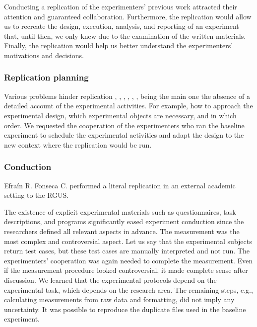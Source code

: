 Conducting a replication of the experimenters' previous work attracted their attention and guaranteed collaboration. Furthermore, the replication would allow us to recreate the design, execution, analysis, and reporting of an experiment that, until then, we only knew due to the examination of the written materials. Finally, the replication would help us better understand the experimenters' motivations and decisions.

\subsubsection{Replication planning}
Various problems hinder replication \cite{Gallardo-2012-CG-PL-SE}, \cite{Vegas-2006-communication-researchers}, \cite{Miller-2005-replicating-SE-experiments}, \cite{Gomez-2014-understanding-replication}, \cite{Demagalhaes-2015-replications-SE}, \cite{Carver-2010-guidelines-replication-SE}, being the main one the absence of a detailed account of the experimental activities. For example, how to approach the experimental design, which experimental objects are necessary, and in which order. We requested the cooperation of the experimenters who ran the baseline experiment to schedule the experimental activities and adapt the design to the new context where the replication would be run.

\subsubsection{Conduction}
Efra\'in R. Fonseca C. performed a literal replication \cite{Gomez-2014-understanding-replication} in an external academic setting to the RGUS.

The existence of explicit experimental materials such as questionnaires, task descriptions, and programs significantly eased experiment conduction since the researchers defined all relevant aspects in advance. The measurement was the most complex and controversial aspect. Let us say that the experimental subjects return test cases, but these test cases are manually interpreted and not run. The experimenters' cooperation was again needed to complete the measurement. Even if the measurement procedure looked controversial, it made complete sense after discussion. We learned that the experimental protocols depend on the experimental task, which depends on the research area. The remaining steps, e.g., calculating measurements from raw data and formatting, did not imply any uncertainty. It was possible to reproduce the duplicate files used in the baseline experiment.

